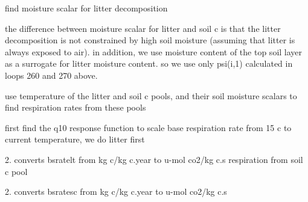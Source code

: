 find moisture scalar for litter decomposition

the difference between moisture scalar for litter and soil c is that the litter decomposition is not constrained by high soil moisture (assuming that litter is always exposed to air). in addition, we use moisture content of the top soil layer as a surrogate for litter moisture content. so we use only psi(i,1) calculated in loops 260 and 270 above.

use temperature of the litter and soil c pools, and their soil moisture scalars to find respiration rates from these pools

first find the q10 response function to scale base respiration rate from 15 c to current temperature, we do litter first

2. converts bsratelt from kg c/kg c.\+year to u-\/mol co2/kg c.\+s respiration from soil c pool

2. converts bsratesc from kg c/kg c.\+year to u-\/mol co2/kg c.\+s 